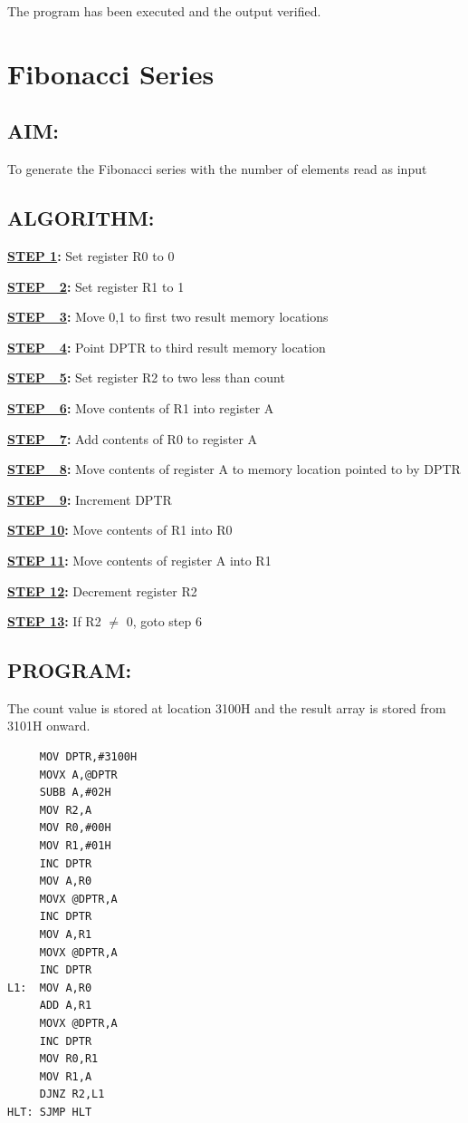 \documentclass[a4paper,28pt]{report}
\begin{document}
The program has been executed and the output verified.
%
%
%
%
\chapter{Fibonacci Series}
\section*{AIM:}
To generate the Fibonacci series with the number of elements read as input
\section*{ALGORITHM:}
\textbf{\underline{STEP 1}:} Set register R0 to 0

\textbf{\underline{STEP\ \ 2}:} Set register R1 to 1

\textbf{\underline{STEP\ \ 3}:} Move 0,1 to first two result memory locations

\textbf{\underline{STEP\ \ 4}:} Point DPTR to third result memory location

\textbf{\underline{STEP\ \ 5}:} Set register R2 to two less than count

\textbf{\underline{STEP\ \ 6}:} Move contents of R1 into register A

\textbf{\underline{STEP\ \ 7}:} Add contents of R0 to register A

\textbf{\underline{STEP\ \ 8}:} Move contents of register A to memory location pointed to by DPTR

\textbf{\underline{STEP\ \ 9}:} Increment DPTR

\textbf{\underline{STEP 10}:} Move contents of R1 into R0

\textbf{\underline{STEP 11}:} Move contents of register A into R1

\textbf{\underline{STEP 12}:} Decrement register R2

\textbf{\underline{STEP 13}:} If R2 $\neq$ 0, goto step 6 

\section*{PROGRAM:}
The count value is stored at location 3100H and the result array is stored from 3101H onward.
\newline
\begin{lstlisting}
     MOV DPTR,#3100H
     MOVX A,@DPTR
     SUBB A,#02H
     MOV R2,A
     MOV R0,#00H
     MOV R1,#01H
     INC DPTR
     MOV A,R0
     MOVX @DPTR,A
     INC DPTR
     MOV A,R1
     MOVX @DPTR,A
     INC DPTR
L1:  MOV A,R0
     ADD A,R1
     MOVX @DPTR,A
     INC DPTR
     MOV R0,R1
     MOV R1,A
     DJNZ R2,L1
HLT: SJMP HLT
\end{lstlisting}
\end{document}
